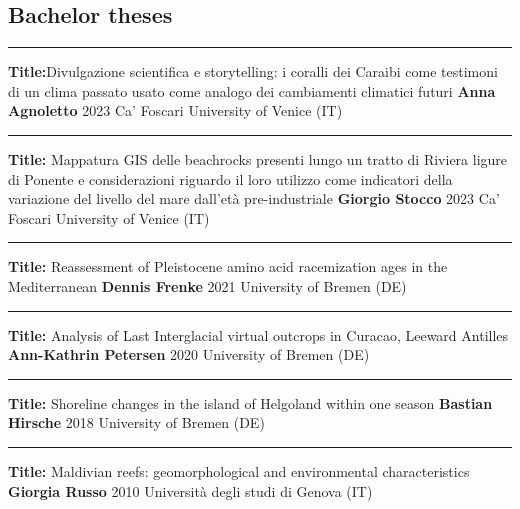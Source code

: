 \documentclass[%
               doublesided,
               paper=a4,
               fontsize=10pt
              ]{my-resume}
\begin{document}
 \subsection{Bachelor theses}
\smallskip
\hrule
\smallskip
    \publication
	{\textbf{Title:}Divulgazione scientifica e storytelling: i coralli dei Caraibi come testimoni di un clima passato usato come analogo dei cambiamenti climatici futuri} %
	{\textbf{Anna Agnoletto}} %
	{2023} %
	{Ca' Foscari University of Venice (IT)} %
	{} %
\smallskip
\hrule

\smallskip
    \publication
	{\textbf{Title:} Mappatura GIS delle beachrocks presenti lungo un tratto di Riviera ligure di Ponente e considerazioni riguardo il loro utilizzo come indicatori della variazione del livello del mare dall’età pre-industriale } %
	{\textbf{Giorgio Stocco}} %
	{2023} %
	{Ca' Foscari University of Venice (IT)} %
	{} %
\smallskip
\hrule
\smallskip
    \publication
	{\textbf{Title:} Reassessment of Pleistocene amino acid racemization ages in the Mediterranean} %
	{\textbf{Dennis Frenke}} %
	{2021} %
	{University of Bremen (DE)} %
	{} %
\smallskip
\hrule
\smallskip
    \publication
	{\textbf{Title:} Analysis of Last Interglacial virtual outcrops in Curacao, Leeward Antilles} %
	{\textbf{Ann-Kathrin Petersen}} %
	{2020} %
	{University of Bremen (DE)} %
	{} %
\smallskip
\hrule
\smallskip
    \publication
	{\textbf{Title:} Shoreline changes in the island of Helgoland within one season} %
	{\textbf{Bastian Hirsche}} %
	{2018} %
	{University of Bremen (DE)} %
	{} %
\smallskip
\hrule
\smallskip
    \publication
	{\textbf{Title:} Maldivian reefs: geomorphological and environmental characteristics} %
	{\textbf{Giorgia Russo}} %
	{2010} %
	{Università degli studi di Genova (IT)} %
	{} %
	
\clearpage
\pagestyle{highlightmain}
\end{document}
